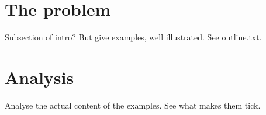 \documentclass[english,submission]{programming}
\begin{document}
%
\section{The problem}
\label{sec:problem}

Subsection of intro? But give examples, well illustrated. See outline.txt.


\section{Analysis}
\label{sec:analysis}

Analyse the actual content of the examples. See what makes them tick.
\end{document}
